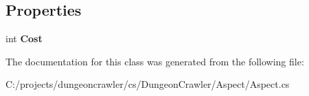 \subsection*{Properties}
\begin{DoxyCompactItemize}
\item 
\hypertarget{class_dungeon_crawler_1_1_aspect_1_1_aspect_aa80fa5e295724be3987c1dcce5f119c4}{}int {\bfseries Cost}\label{class_dungeon_crawler_1_1_aspect_1_1_aspect_aa80fa5e295724be3987c1dcce5f119c4}

\end{DoxyCompactItemize}


The documentation for this class was generated from the following file\+:\begin{DoxyCompactItemize}
\item 
C\+:/projects/dungeoncrawler/cs/\+Dungeon\+Crawler/\+Aspect/Aspect.\+cs\end{DoxyCompactItemize}
